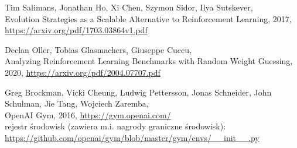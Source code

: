\documentclass[12pt,a4paper]{article}
\begin{document}
\pagebreak
\begin{thebibliography}{9}
  Tim Salimans, Jonathan Ho, Xi Chen, Szymon Sidor, Ilya Sutskever,\\
  Evolution Strategies as a Scalable Alternative to Reinforcement Learning,
  2017, \href{https://arxiv.org/pdf/1703.03864v1.pdf}{https://arxiv.org/pdf/1703.03864v1.pdf}

  Declan Oller, Tobias Glasmachers, Giuseppe Cuccu, \\
  Analyzing Reinforcement Learning Benchmarks with Random Weight Guessing,
  2020, \href{https://arxiv.org/pdf/2004.07707.pdf}{https://arxiv.org/pdf/2004.07707.pdf}

  Greg Brockman, Vicki Cheung, Ludwig Pettersson, Jonas Schneider, John Schulman, Jie Tang, Wojciech Zaremba,\\
  OpenAI Gym, 2016, \href{https://gym.openai.com/}{https://gym.openai.com/} \\
  rejestr środowisk (zawiera m.i. nagrody graniczne środowisk): \\
  \href{https://github.com/openai/gym/blob/master/gym/envs/\_\_init\_\_.py}{https://github.com/openai/gym/blob/master/gym/envs/\_\_init\_\_.py}

\end{thebibliography}
\end{document}
